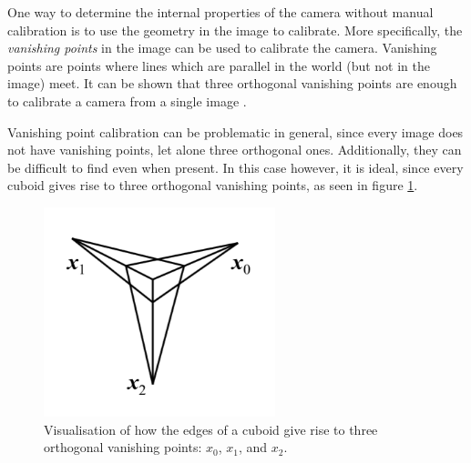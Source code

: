 One way to determine the internal properties of the camera without manual calibration is to use the geometry in the image to calibrate.
More specifically, the \textit{vanishing points} in the image can be used to calibrate the camera.
Vanishing points are points where lines which are parallel in the world (but not in the image) meet.
It can be shown that three orthogonal vanishing points are enough to calibrate a camera from a single image \cite[p. 226]{hartley-zisserman}.

Vanishing point calibration can be problematic in general, since every image does not have vanishing points, let alone three orthogonal ones.
Additionally, they can be difficult to find even when present.
In this case however, it is ideal, since every cuboid gives rise to three orthogonal vanishing points, as seen in figure \ref{fig:vanishing_points}.

\begin{figure}
\begin{center}
\includegraphics[width=0.6\textwidth]{figures/vanishing_points.png}
\end{center}
\caption[Vanishing points induced by the edges of a cuboid]{Visualisation of how the edges of a cuboid give rise to three orthogonal vanishing points: $x_0$, $x_1$, and $x_2$.}
\label{fig:vanishing_points}
\end{figure}



